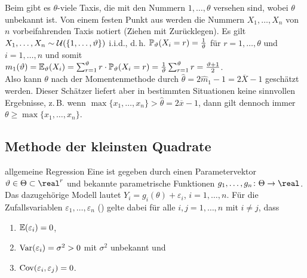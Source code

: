 \begin{Bsp}
    Beim  gibt es $\theta$-viele Taxis, die mit den Nummern
    $1, \dotsc, \theta$ versehen sind, wobei $\theta$ unbekannt ist.
    Von einem festen Punkt aus werden die Nummern $X_1, \dotsc, X_n$ von $n$ vorbeifahrenden
    Taxis notiert (Ziehen mit Zurücklegen).
    Es gilt $X_1, \dotsc, X_n \sim \mathcal{U}(\{1, \dotsc, \vartheta\})$ i.i.d.,
    d.\,h. $\mathbb{P}_\vartheta(X_i = r) = \frac{1}{\vartheta}$ für $r = 1, \dotsc, \theta$ und
    $i = 1, \dotsc, n$ und somit\\
    $m_1(\vartheta) = \mathbb{E}_\vartheta(X_i) = \sum_{r=1}^\vartheta r \cdot \mathbb{P}_\vartheta(X_i = r)
    = \frac{1}{\vartheta} \sum_{r=1}^\vartheta r = \frac{\vartheta + 1}{2}$.\\
    Also kann $\theta$ nach der Momentenmethode durch $\widehat{\theta} = 2\widehat{m}_1 - 1 =
    2\overline{X} - 1$ geschätzt werden.
    Dieser Schätzer liefert aber in bestimmten Situationen keine sinnvollen Ergebnisse, z.\,B.
    wenn $\max\{x_1, \dotsc, x_n\} > \widehat{\theta} = 2\overline{x} - 1$,
    dann gilt dennoch immer $\theta \ge \max\{x_1, \dotsc, x_n\}$.
\end{Bsp}

\subsection{%
    Methode der kleinsten Quadrate%
}

\begin{Def}{allgemeine Regression}
    Eine  ist gegeben durch einen Parametervektor
    $\theta \in \Theta \subset \real^r$ und bekannte parametrische Funktionen
    $g_1, \dotsc, g_n\colon \Theta \rightarrow \real$.
    Das dazugehörige Modell lautet $Y_i = g_i(\theta) + \varepsilon_i$, $i = 1, \dotsc, n$.
    Für die Zufallsvariablen $\varepsilon_1, \dotsc, \varepsilon_n$ ()
    gelte dabei für alle $i, j = 1, \dotsc, n$ mit $i \not= j$, dass
    \begin{enumerate}
        \item
        $\mathbb{E}(\varepsilon_i) = 0$,

        \item
        $\mathrm{Var}(\varepsilon_i) = \sigma^2 > 0$ mit $\sigma^2$ unbekannt und

        \item
        $\mathrm{Cov}(\varepsilon_i, \varepsilon_j) = 0$.
    \end{enumerate}
\end{Def}


